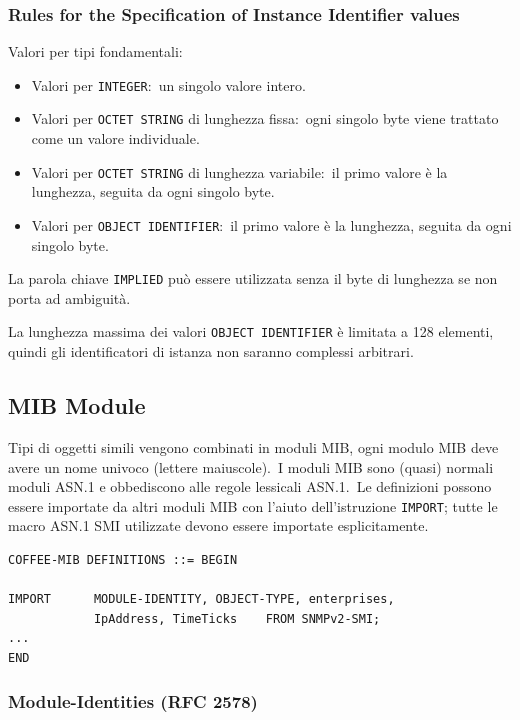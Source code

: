 \subsubsection{Rules for the Specification of Instance Identifier values}

Valori per tipi fondamentali:

\begin{itemize}
    \item Valori per \texttt{INTEGER}:\ un singolo valore intero.
    \item Valori per \texttt{OCTET STRING} di lunghezza fissa:\ ogni singolo byte viene trattato come un valore individuale.
    \item Valori per \texttt{OCTET STRING} di lunghezza variabile:\ il primo valore è la lunghezza, seguita da ogni singolo byte.
    \item Valori per \texttt{OBJECT IDENTIFIER}:\ il primo valore è la lunghezza, seguita da ogni singolo byte.
\end{itemize}
La parola chiave \texttt{IMPLIED} può essere utilizzata senza il byte di lunghezza se non porta ad ambiguità.

La lunghezza massima dei valori \texttt{OBJECT IDENTIFIER} è limitata a 128 elementi, quindi gli identificatori di istanza non saranno complessi arbitrari.

\subsection{MIB Module}

Tipi di oggetti simili vengono combinati in moduli MIB,  ogni modulo MIB deve avere un nome univoco (lettere maiuscole).\
I moduli MIB sono (quasi) normali moduli ASN.1 e obbediscono alle regole lessicali ASN.1.\
Le definizioni possono essere importate da altri moduli MIB con l'aiuto dell'istruzione \texttt{IMPORT}; tutte le macro ASN.1 SMI utilizzate devono essere importate esplicitamente.

\begin{verbatim}
COFFEE-MIB DEFINITIONS ::= BEGIN

IMPORT      MODULE-IDENTITY, OBJECT-TYPE, enterprises,
            IpAddress, TimeTicks    FROM SNMPv2-SMI;
...
END
\end{verbatim}

\subsubsection{Module-Identities (RFC 2578)}


